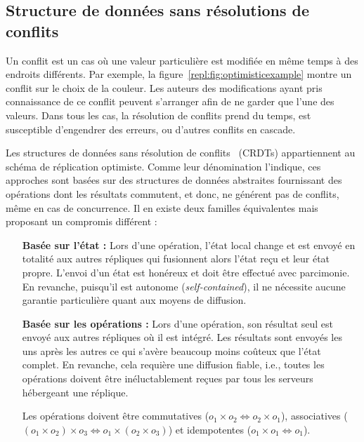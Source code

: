 \subsection{Structure de données sans résolutions de conflits}
\label{repl:subsec:crdts}

Un conflit est un cas où une valeur particulière est modifiée en même temps à
des endroits différents. Par exemple, la figure~\ref{repl:fig:optimisticexample}
montre un conflit sur le choix de la couleur. Les auteurs des modifications
ayant pris connaissance de ce conflit peuvent s'arranger afin de ne garder que
l'une des valeurs. Dans tous les cas, la résolution de conflits prend du temps,
est susceptible d'engendrer des erreurs, ou d'autres conflits en cascade.

Les structures de données sans résolution de
conflits~\cite{shapiro2011comprehensive} (CRDTs) appartiennent au schéma de
réplication optimiste. Comme leur dénomination l'indique, ces approches sont
basées sur des structures de données abstraites fournissant des opérations dont
les résultats commutent, et donc, ne générent pas de conflits, même en cas de
concurrence.  Il en existe deux familles équivalentes mais proposant un
compromis différent :
\begin{itemize}
\item [\textbf{Basée sur l'état :}] Lors d'une opération, l'état local change et
  est envoyé en totalité aux autres répliques qui fusionnent alors l'état reçu
  et leur état propre. L'envoi d'un état est honéreux et doit être effectué avec
  parcimonie. En revanche, puisqu'il est autonome (\emph{self-contained}), il ne
  nécessite aucune garantie particulière quant aux moyens de diffusion.
\item [\textbf{Basée sur les opérations :}] Lors d'une opération, son résultat
  seul est envoyé aux autres répliques où il est intégré. Les résultats sont
  envoyés les uns après les autres ce qui s'avère beaucoup moins coûteux que
  l'état complet. En revanche, cela requière une diffusion fiable, i.e., toutes
  les opérations doivent être inéluctablement reçues par tous les serveurs
  hébergeant une réplique.

  Les opérations doivent être commutatives
  ($o_1 \times o_2 \Leftrightarrow o_2 \times o_1$), associatives
  ($(o_1 \times o_2) \times o_3 \Leftrightarrow o_1 \times (o_2 \times o_3)$) et
  idempotentes ($o_1 \times o_1 \Leftrightarrow o_1$).
\end{itemize}

